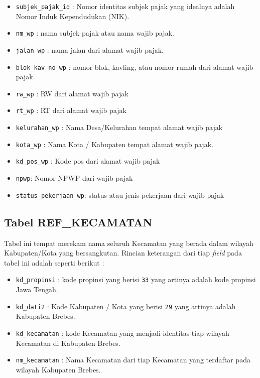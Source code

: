 \begin{itemize}
	\item \texttt{subjek\_pajak\_id} : Nomor identitas subjek pajak yang idealnya adalah Nomor Induk Kependudukan (NIK).
	\item \texttt{nm\_wp} : nama subjek pajak atau nama wajib pajak.
	\item \texttt{jalan\_wp} : nama jalan dari alamat wajib pajak.
	\item \texttt{blok\_kav\_no\_wp} : nomor blok, kavling, atau nomor rumah dari alamat wajib pajak.
	\item \texttt{rw\_wp} : RW dari alamat wajib pajak
	\item \texttt{rt\_wp} : RT dari alamat wajib pajak
	\item \texttt{kelurahan\_wp} : Nama Desa/Kelurahan tempat alamat wajib pajak
	\item \texttt{kota\_wp} : Nama Kota / Kabupaten tempat alamat wajib pajak.
	\item \texttt{kd\_pos\_wp} : Kode pos dari alamat wajib pajak
	\item \texttt{npwp}: Nomor NPWP dari wajib pajak
	\item \texttt{status\_pekerjaan\_wp}: status atau jenis pekerjaan dari wajib pajak
\end{itemize}

\subsection{Tabel REF\_KECAMATAN}

Tabel ini tempat merekam nama seluruh Kecamatan yang berada dalam wilayah Kabupaten/Kota yang bersangkutan. Rincian keterangan dari tiap \textit{field} pada tabel ini adalah seperti berikut :

\begin{itemize}
	\item \texttt{kd\_propinsi} : kode propinsi yang berisi \texttt{33} yang artinya adalah kode propinsi Jawa Tengah.
	\item \texttt{kd\_dati2} : Kode Kabupaten / Kota yang berisi \texttt{29} yang artinya adalah Kabupaten Brebes.
	\item \texttt{kd\_kecamatan} : kode Kecamatan yang menjadi identitas tiap wilayah Kecamatan di Kabupaten Brebes.
	\item \texttt{nm\_kecamatan} : Nama Kecamatan dari tiap Kecamatan yang terdaftar pada wilayah Kabupaten Brebes.
\end{itemize}

